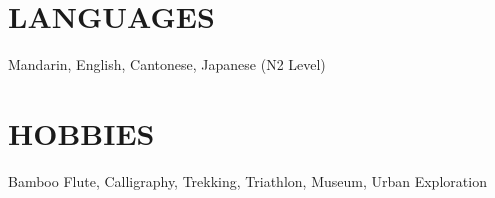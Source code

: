 


\section*{LANGUAGES}
Mandarin, English, Cantonese, Japanese (N2 Level)
\section*{HOBBIES}
Bamboo Flute, Calligraphy, Trekking, Triathlon, Museum, Urban Exploration
